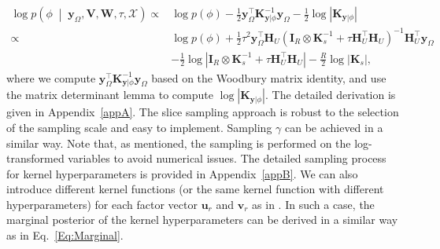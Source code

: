 \documentclass[12pt]{article}
\newcommand{\given}{\;\middle|\;}
\newcommand{\bd}[1]{\boldsymbol{#1}}
\begin{document}
\begin{equation} \label{Eq:Marginal}
\begin{aligned}
\log{p\left(\phi\given\boldsymbol{y}_{\Omega},\boldsymbol{V},\boldsymbol{W},\tau,\boldsymbol{\mathcal{X}}\right)}\propto&\log{p(\phi)}-\frac{1}{2}\boldsymbol{y}_{\Omega}^{\top}\boldsymbol{K}_{\left.\boldsymbol{y}\right|\phi}^{-1}\boldsymbol{y}_{\Omega}-\frac{1}{2}\log{\left|\boldsymbol{K}_{\left.\boldsymbol{y}\right|\phi}\right|} \\
\propto&\log{p(\phi)}+\frac{1}{2}\tau^2\boldsymbol{y}_{\Omega}^{\top}\boldsymbol{H}_{U}\left(\boldsymbol{I}_{R}\otimes\boldsymbol{K}_{s}^{-1}+\tau\boldsymbol{H}_{U}^{\top}\boldsymbol{H}_{U}\right)^{-1}\boldsymbol{H}_{U}^{\top}\boldsymbol{y}_{\Omega} \\
&-\frac{1}{2}\log{\left|\boldsymbol{I}_{R}\otimes\boldsymbol{K}_{s}^{-1}+\tau\boldsymbol{H}_{U}^{\top}\boldsymbol{H}_{U}\right|}-\frac{R}{2}\log{\left|\boldsymbol{K}_{s}\right|},
\end{aligned}
\end{equation}
where we compute $\boldsymbol{y}_{\Omega}^{\top}\boldsymbol{K}_{\left.\boldsymbol{y}\right|\phi}^{-1}\boldsymbol{y}_{\Omega}$ based on the Woodbury matrix identity, and use the matrix determinant lemma to compute $\log{\left|\boldsymbol{K}_{\left.\boldsymbol{y}\right|\phi}\right|}$. The detailed derivation is given in Appendix~\ref{appA}. The slice sampling approach is robust to the selection of the sampling scale and easy to implement. Sampling $\gamma$ can be achieved in a similar way. Note that, as mentioned, the sampling is performed on the log-transformed variables to avoid numerical issues. The detailed sampling process for kernel hyperparameters is provided in Appendix~\ref{appB}. %
We can also introduce different kernel functions (or the same kernel function with different hyperparameters) for each factor vector $\bd{u}_r$ and $\boldsymbol{v}_{r}$ as in \citet{luttinen2009variational}. In such a case, the marginal posterior of the kernel hyperparameters can be derived in a similar way as in Eq.~\eqref{Eq:Marginal}.
\end{document}
